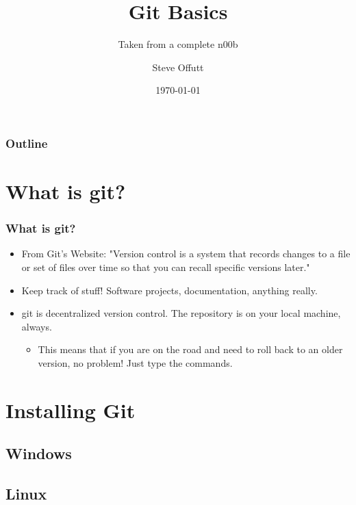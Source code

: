 \documentclass{beamer}
\title{Git Basics}
\subtitle{Taken from a complete n00b}
\author{Steve Offutt}
\institute{OSSEM}
\date{\today}
\begin{document}
\begin{frame}
    \titlepage
\end{frame}

\begin{frame}
    \frametitle{Outline}
    \tableofcontents
\end{frame} 

\section{What is git?}
\begin{frame}
    \frametitle{What is git?}
    \begin{itemize}
        \item{From Git's Website:}
            "Version control is a system that records changes to a file or set of files over time so that you can recall specific versions later."
        \item{Keep track of stuff! Software projects, documentation, anything really.}
        \item{git is decentralized version control. The repository is on your local machine, always.}
            \begin{itemize}
                \item{This means that if you are on the road and need to roll back to an older version, no problem! Just type the commands.}
            \end{itemize}
    \end{itemize}
\end{frame} 

\section{Installing Git}
\subsection{Windows}
\subsection{Linux}
\end{document}

